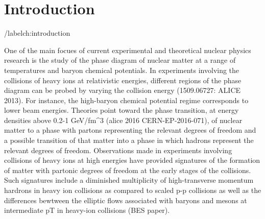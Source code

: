 \chapter{Introduction} /label{ch:introduction}

One of the main focues of current experimental and theoretical nuclear physics research is the study of the phase diagram of nuclear matter at a range of temperatures and baryon chemical potentials. In experiments involving the collisions of heavy ions at relativistic energies, different regions of the phase diagram can be probed by varying the collision energy (1509.06727: ALICE 2013). For instance, the high-baryon chemical potential regime corresponds to lower beam energies. Theories point toward the phase transition, at energy densities above 0.2-1 GeV/fm^3 (alice 2016 CERN-EP-2016-071), of nuclear matter to a phase with partons representing the relevant degrees of freedom and a possible transition of that matter into a phase in which hadrons represent the relevant degrees of freedom. Observations made in experiments involving collisions of heavy ions at high energies have provided signatures of the formation of matter with partonic degrees of freedom at the early stages of the collisions. Such signatures include a diminished multiplicity of high-transverse momentum hardrons in heavy ion collisions as compared to scaled p-p collisions as well as the differences bewtween the elliptic flows associated with baryons and mesons at intermediate pT in heavy-ion collisions (BES paper).
